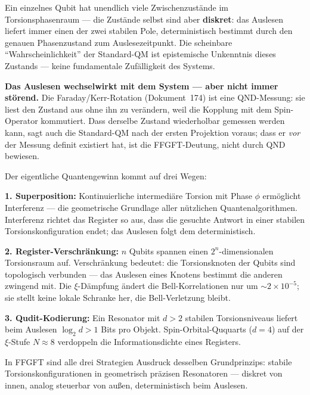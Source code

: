 \begin{conclusionBox}
Ein einzelnes Qubit hat unendlich viele Zwischenzustände
im Torsionsphasenraum --- die Zustände selbst sind aber
\textbf{diskret}: das Auslesen liefert immer einen der
zwei stabilen Pole, deterministisch bestimmt durch den
genauen Phasenzustand zum Auslesezeitpunkt.
Die scheinbare ``Wahrscheinlichkeit'' der Standard-QM
ist epistemische Unkenntnis dieses Zustands ---
keine fundamentale Zufälligkeit des Systems.

\textbf{Das Auslesen wechselwirkt mit dem System ---
aber nicht immer störend.}
Die Faraday/Kerr-Rotation (Dokument~174) ist eine
QND-Messung: sie liest den Zustand aus ohne ihn zu verändern,
weil die Kopplung mit dem Spin-Operator kommutiert.
Dass derselbe Zustand wiederholbar gemessen werden kann,
sagt auch die Standard-QM nach der ersten Projektion voraus;
dass er \emph{vor} der Messung definit existiert hat,
ist die FFGFT-Deutung, nicht durch QND bewiesen.

Der eigentliche Quantengewinn kommt auf drei Wegen:

\textbf{1. Superposition:}
Kontinuierliche intermediäre Torsion mit Phase $\phi$
ermöglicht Interferenz --- die geometrische Grundlage
aller nützlichen Quantenalgorithmen.
Interferenz richtet das Register so aus, dass
die gesuchte Antwort in einer stabilen Torsionskonfiguration
endet; das Auslesen folgt dem deterministisch.

\textbf{2. Register-Verschränkung:}
$n$ Qubits spannen einen $2^n$-dimensionalen Torsionsraum auf.
Verschränkung bedeutet: die Torsionsknoten der Qubits
sind topologisch verbunden --- das Auslesen eines
Knotens bestimmt die anderen zwingend mit.
Die $\xi$-Dämpfung ändert die Bell-Korrelationen nur um
$\sim 2\times10^{-5}$; sie stellt keine lokale Schranke her,
die Bell-Verletzung bleibt.

\textbf{3. Qudit-Kodierung:}
Ein Resonator mit $d > 2$ stabilen Torsionsniveaus
liefert beim Auslesen $\log_2 d > 1$ Bits pro Objekt.
Spin-Orbital-Ququarts ($d = 4$) auf der
$\xi$-Stufe $N \approx 8$ verdoppeln die
Informationsdichte eines Registers.

In FFGFT sind alle drei Strategien Ausdruck desselben
Grundprinzips: stabile Torsionskonfigurationen
in geometrisch präzisen Resonatoren --- diskret von innen,
analog steuerbar von außen, deterministisch beim Auslesen.
\end{conclusionBox}


